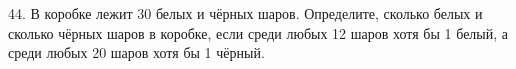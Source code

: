 44. В коробке лежит 30 белых и чёрных шаров. Определите, сколько белых и сколько чёрных шаров в коробке, если среди любых 12 шаров хотя бы 1 белый, а среди любых 20 шаров хотя бы 1 чёрный.\\
